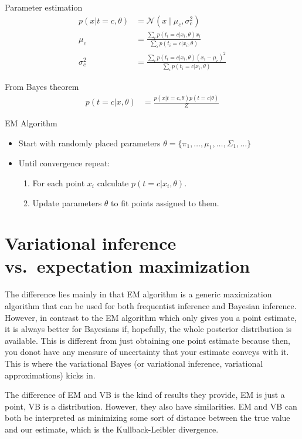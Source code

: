 \documentclass{book}
\begin{document}
Parameter estimation
\begin{align*}
p(x | t=c, \theta) &= \mathcal{N}(x\mid \mu_c ,\sigma^{2}_{c}) \\
\mu_c  &= \frac{\sum_i p(t_i = c | x_i, \theta) x_i}{\sum_i p(t_i = c | x_i, \theta)} \\
\sigma^{2}_{c} &= \frac{\sum_i p(t_i = c | x_i, \theta) (x_i - \mu_c)^2}{\sum_i p(t_i = c | x_i, \theta)}
\end{align*}

From Bayes theorem
\begin{align*}
p(t=c | x, \theta) &= \frac{p(x | t=c, \theta) p(t=c | \theta)}{Z}
\end{align*}

EM Algorithm
\begin{itemize}
\item Start with randomly placed parameters $\theta = \{ \pi_1, \dots, \mu_1, \dots, \Sigma_1, \dots \}$
\item Until convergence repeat:
\begin{enumerate}
\item For each point $x_i$ calculate $p(t=c | x_i, \theta)$.
\item Update parameters $\theta$ to fit points assigned to them.
\end{enumerate}
\end{itemize}

\section{Variational inference vs.\ expectation maximization}
The difference lies mainly in that EM algorithm is a generic maximization algorithm that can be used for both frequentist inference and Bayesian inference. However, in contrast to the EM algorithm which only gives you a point estimate, it is always better for Bayesians if, hopefully, the whole posterior distribution is available. This is different from just obtaining one point estimate because then, you donot have any measure of uncertainty that your estimate conveys with it. This is where the variational Bayes (or variational inference, variational approximations) kicks in.

The difference of EM and VB is the kind of results they provide, EM is just a point, VB is a distribution. However, they also have similarities. EM and VB can both be interpreted as minimizing some sort of distance between the true value and our estimate, which is the Kullback-Leibler divergence.
\end{document}
